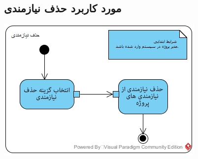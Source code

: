 \documentclass{article}
\begin{document}
\subsection*{مورد کاربرد حذف نیازمندی}
\vspace{2cm}
\begin{center}
\includegraphics[width=\textwidth]{ActivityDiagrams/25.jpg}
\end{center}

\newpage
\vspace{2cm}
\end{document}
